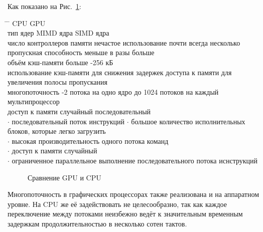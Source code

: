 \documentclass[a4paper,14pt,russian]{extreport}
\begin{document}
Как показано на Рис.~\ref{ris:compare}:
\par
\begin{tabbing}
\hspace{0.4\textwidth} \= \hspace{0.3\textwidth} \= \hspace{0.3\textwidth} \kill
 \> CPU \> GPU \\
тип ядер \> MIMD ядра \> SIMD ядра \\
число контроллеров памяти \> нечастое использование \> почти всегда несколько \\
пропускная способность \> меньше \> в разы больше \\
объём кэш-памяти \> больше -256 кБ \\
использование кэш-памяти \> для снижения задержек доступа к памяти \> для увеличения полосы пропускания \\
многопоточность -2 потока на одно ядро \> до 1024 потоков на каждый мультипроцессор \\
доступ к памяти \> случайный \> последовательный \\
$\cdot$ последовательный поток инструкций \> $\cdot$ большое количество исполнительных блоков, которые легко загрузить\\
$\cdot$ высокая производительность одного потока команд \> \\
$\cdot$ доступ к памяти случайный \> \\
$\cdot$ ограниченное параллельное выполнение последовательного потока иснструкций \> \\
\end{tabbing}
\par
\begin{figure}[h]
\caption{Сравнение GPU и CPU}
\label{ris:compare}
\end{figure}
\par 
Многопоточность в графических процессорах также реализована и на аппаратном уровне. На CPU же её задействовать не целесообразно, так как каждое переключение между потоками неизбежно ведёт к значительным временным задержкам продолжительностью в несколько сотен тактов. 
\end{document}
